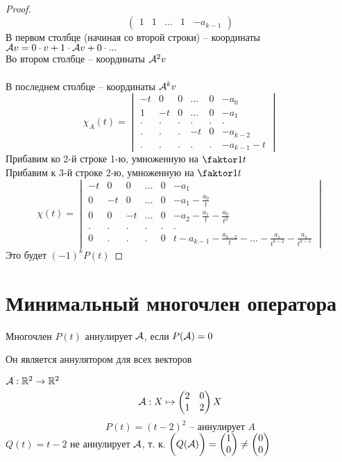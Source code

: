 \begin{proof}
$$\begin{pmatrix}
		1 & 1 & ... & 1 & -a_{k - 1}
	\end{pmatrix} $$
	В первом столбце (начиная со второй строки) -- координаты $ \mathcal{A}v = 0 \cdot v + 1 \cdot \mathcal{A}v + 0 \cdot ... $ \\
	Во втором столбце -- координаты $ \mathcal{A}^2v $ \\
	\widedots[10em] \\
	В последнем столбце -- координаты $ \mathcal{A}^kv $
	$$ \chi_A(t) =
	\begin{vmatrix}
		-t & 0 & 0 & ... & 0 & -a_0 \\
		1 & -t & 0 & ... & 0 & -a_1 \\
		. & . & . & . & . & . \\
		. & . & . & -t & 0 & -a_{k - 2} \\
		. & . & . & . & . & -a_{k - 1} - t
	\end{vmatrix} $$
	Прибавим ко 2-й строке 1-ю, умноженную на $ \faktor1t $ \\
	Прибавим к 3-й строке 2-ю, умноженную на $ \faktor1t $
	\widedots[10em]
	$$ \chi(t) =
	\begin{vmatrix}
		-t & 0 & 0 & ... & 0 & -a_1 \\
		0 & -t & 0 & ... & 0 & -a_1 - \frac{a_0}t \\
		0 & 0 & -t & ... & 0 & -a_2 - \frac{a_1}t - \frac{a_0}{t^2} \\
		. & . & . & . & . & . \\
		0 & . & . & . & 0 & t - a_{k - 1} - \frac{a_{k -2}}t - ... - \frac{a_1}{t^{k - 2}} - \frac{a_1}{t^{k - 1}}
	\end{vmatrix} $$
	Это будет $ (-1)^kP(t) $
\end{proof}

\section{Минимальный многочлен оператора}

\begin{definition}
	Многочлен $ P(t) $ аннулирует $ \mathcal{A} $, если $ P(\mathcal{A}) = 0 $
\end{definition}

\begin{remark}
	Он является аннулятором для всех векторов
\end{remark}

\begin{eg}
	$ \mathcal{A} : \mathbb{R}^2 \to \mathbb{R}^2 $
	$$ \mathcal{A} : X \mapsto
	\begin{pmatrix}
		2 & 0 \\
		1 & 2
	\end{pmatrix}X $$
	$$ P(t) = (t - 2)^2 \text{ -- аннулирует } A $$
	$ Q(t) = t - 2 $ не аннулирует $ \mathcal{A} $, т. к. $ \bigg( Q(\mathcal{A}) \bigg) =
	\begin{pmatrix}
		1 \\
		0
	\end{pmatrix} \ne
	\begin{pmatrix}
		0 \\
		0
	\end{pmatrix} $
\end{eg}

